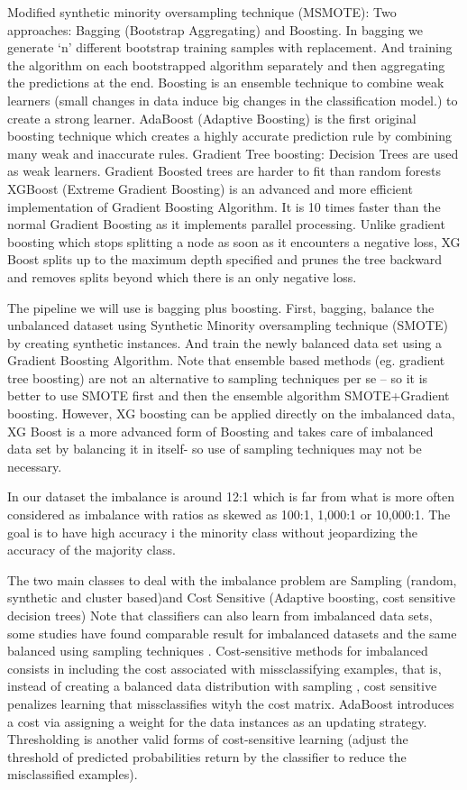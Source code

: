 \documentclass[11pt]{article}
\theoremstyle{definition}
\theoremstyle{remark}
\begin{document}
{Modified synthetic minority oversampling technique (MSMOTE): Two approaches: Bagging (Bootstrap Aggregating) and Boosting. In bagging we generate ‘n’ different bootstrap training samples with replacement. And training the algorithm on each bootstrapped algorithm separately and then aggregating the predictions at the end. 
Boosting is an ensemble technique to combine weak learners (small changes in data induce big changes in the classification model.) to create a strong learner. 
AdaBoost (Adaptive Boosting) is the first original boosting technique which creates a highly accurate prediction rule by combining many weak and inaccurate rules. 
Gradient Tree boosting: Decision Trees are used as weak learners. Gradient Boosted trees are harder to fit than random forests
XGBoost (Extreme Gradient Boosting) is an advanced and more efficient implementation of Gradient Boosting Algorithm. It is 10 times faster than the normal Gradient Boosting as it implements parallel processing. Unlike gradient boosting which stops splitting a node as soon as it encounters a negative loss, XG Boost splits up to the maximum depth specified and prunes the tree backward and removes splits beyond which there is an only negative loss.

The pipeline we will use is bagging plus boosting. First, bagging, balance the unbalanced dataset using Synthetic Minority oversampling technique (SMOTE) by creating synthetic instances. And train the newly balanced data set using a Gradient Boosting Algorithm. Note that ensemble based methods (eg. gradient tree boosting) are not an alternative to sampling techniques per se – so it is better to use SMOTE first and then  the ensemble algorithm SMOTE+Gradient boosting. However, XG boosting can be applied directly on the imbalanced data, XG Boost is a more advanced form of Boosting and takes care of imbalanced data set by balancing it in itself- so use of sampling techniques may not be necessary.

In our dataset the imbalance is around 12:1 which is far from what is more often considered as imbalance with ratios as skewed as 100:1, 1,000:1 or 10,000:1\cite{he2009learning}.
The goal is to have high accuracy i the minority class without jeopardizing  the accuracy of the majority class.

The two main classes to deal with the imbalance problem are Sampling (random, synthetic and cluster based)and Cost Sensitive (Adaptive boosting, cost sensitive decision trees) 
Note that classifiers can also learn from imbalanced data sets, some studies have found comparable result for imbalanced datasets and the same balanced using sampling techniques \cite{japkowicz2002class}.
Cost-sensitive methods for imbalanced consists in including the cost associated with missclassifying examples, that is, instead of creating a balanced data distribution with sampling , cost sensitive penalizes learning that missclassifies wityh the cost matrix. AdaBoost introduces a cost via assigning a weight for the data instances as an updating strategy. Thresholding is another valid forms of cost-sensitive learning (adjust the threshold of predicted probabilities return by the classifier to reduce the misclassified examples).

}
\end{document}

